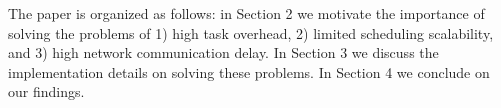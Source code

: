 The paper is organized as follows: in Section 2 we motivate the importance of solving the problems of 1) high task overhead, 2) limited scheduling scalability, and 3) high network communication delay. In Section 3 we discuss the implementation details on solving these problems. In Section 4 we conclude on our findings.


